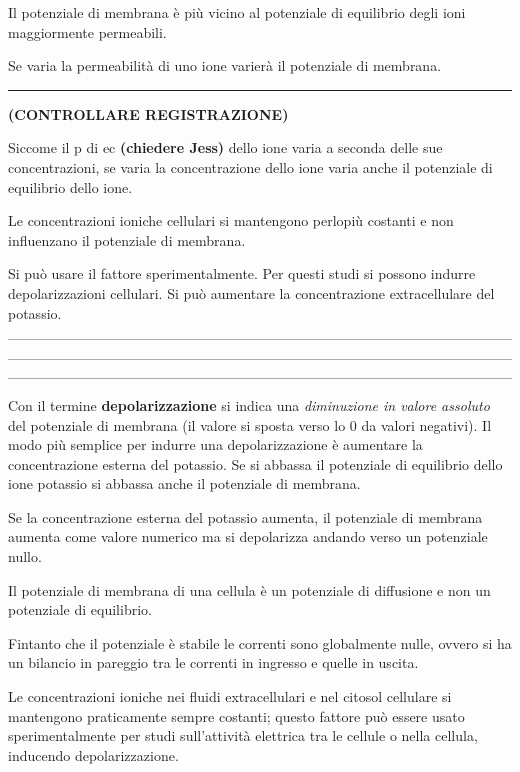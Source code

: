 \documentclass[]{article}
\date{}
\begin{document}
Il potenziale di membrana è più vicino al potenziale di equilibrio degli
ioni maggiormente permeabili.

Se varia la permeabilità di uno ione varierà il potenziale di membrana.

\begin{center}\rule{0.5\linewidth}{\linethickness}\end{center}

\textbf{(CONTROLLARE REGISTRAZIONE)}

Siccome il p di ec \textbf{(chiedere Jess)} dello ione varia a seconda
delle sue concentrazioni, se varia la concentrazione dello ione varia
anche il potenziale di equilibrio dello ione.

Le concentrazioni ioniche cellulari si mantengono perlopiù costanti e
non influenzano il potenziale di membrana.

Si può usare il fattore sperimentalmente. Per questi studi si possono
indurre depolarizzazioni cellulari. Si può aumentare la concentrazione
extracellulare del potassio.
\_\_\_\_\_\_\_\_\_\_\_\_\_\_\_\_\_\_\_\_\_\_\_\_\_\_\_\_\_\_\_\_\_\_\_\_\_\_\_\_\_\_\_\_\_\_\_\_\_\_\_\_\_\_\_\_\_\_\_\_\_\_\_\_\_\_\_\_\_\_\_\_\_\_\_\_\_\_\_\_\_\_\_\_\_\_\_\_\_\_\_\_\_\_\_\_\_\_\_\_\_\_\_\_\_\_\_\_\_\_\_\_\_\_\_\_\_\_\_\_\_\_\_\_\_\_\_\_\_\_\_\_\_\_\_\_\_\_\_\_\_\_\_\_

Con il termine \textbf{depolarizzazione} si indica una \emph{diminuzione
in valore assoluto} del potenziale di membrana (il valore si sposta
verso lo 0 da valori negativi). Il modo più semplice per indurre una
depolarizzazione è aumentare la concentrazione esterna del potassio. Se
si abbassa il potenziale di equilibrio dello ione potassio si abbassa
anche il potenziale di membrana.

Se la concentrazione esterna del potassio aumenta, il potenziale di
membrana aumenta come valore numerico ma si depolarizza andando verso un
potenziale nullo.

Il potenziale di membrana di una cellula è un potenziale di diffusione e
non un potenziale di equilibrio.

Fintanto che il potenziale è stabile le correnti sono globalmente nulle,
ovvero si ha un bilancio in pareggio tra le correnti in ingresso e
quelle in uscita.

Le concentrazioni ioniche nei fluidi extracellulari e nel citosol
cellulare si mantengono praticamente sempre costanti; questo fattore può
essere usato sperimentalmente per studi sull'attività elettrica tra le
cellule o nella cellula, inducendo depolarizzazione.
\end{document}
